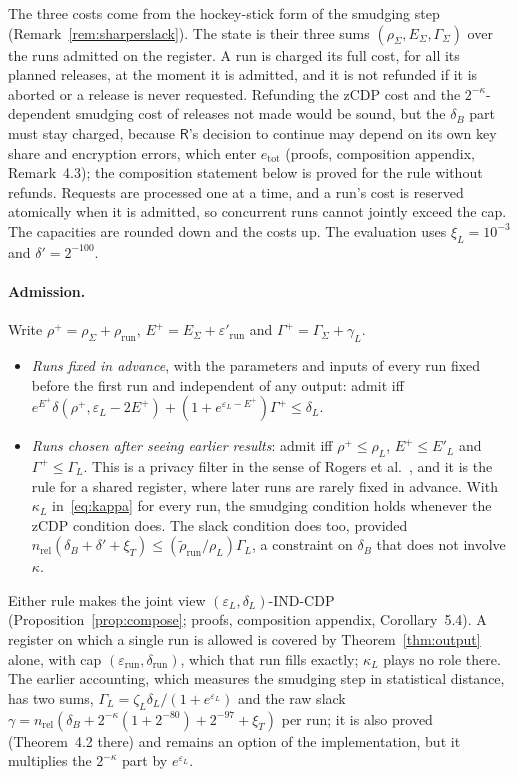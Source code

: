 \documentclass[11pt]{article}
\theoremstyle{definition}
\theoremstyle{plain}
\newcommand{\Party}[1]{\textsf{#1}}
\newcommand{\Rp}{\Party{R}}
\begin{document}
The three costs come from the hockey-stick form of the smudging step (Remark~\ref{rem:sharperslack}). The state is their three sums $(\rho_\Sigma, E_\Sigma, \Gamma_\Sigma)$ over the runs admitted on the register. A run is charged its full cost, for all its planned releases, at the moment it is admitted, and it is not refunded if it is aborted or a release is never requested. Refunding the zCDP cost and the $2^{-\kappa}$-dependent smudging cost of releases not made would be sound, but the $\delta_B$ part must stay charged, because $\Rp$'s decision to continue may depend on its own key share and encryption errors, which enter $e_{\mathrm{tot}}$ (proofs, composition appendix, Remark~4.3); the composition statement below is proved for the rule without refunds. Requests are processed one at a time, and a run's cost is reserved atomically when it is admitted, so concurrent runs cannot jointly exceed the cap. The capacities are rounded down and the costs up. The evaluation uses $\xi_L = 10^{-3}$ and $\delta' = 2^{-100}$.

\paragraph{Admission.} Write $\rho^+ = \rho_\Sigma + \rho_{\mathrm{run}}$, $E^+ = E_\Sigma + \varepsilon'_{\mathrm{run}}$ and $\Gamma^+ = \Gamma_\Sigma + \gamma_L$.
\begin{itemize}[noitemsep]
  \item \emph{Runs fixed in advance}, with the parameters and inputs of every run fixed before the first run and independent of any output: admit iff $e^{E^+}\delta(\rho^+, \varepsilon_L - 2E^+) + (1 + e^{\varepsilon_L - E^+})\Gamma^+ \le \delta_L$.
  \item \emph{Runs chosen after seeing earlier results}: admit iff $\rho^+ \le \rho_L$, $E^+ \le E'_L$ and $\Gamma^+ \le \Gamma_L$. This is a privacy filter in the sense of Rogers et al.~\cite{rogers2016odometers}, and it is the rule for a shared register, where later runs are rarely fixed in advance. With $\kappa_L$ in~\eqref{eq:kappa} for every run, the smudging condition holds whenever the zCDP condition does. The slack condition does too, provided $n_{\mathrm{rel}}(\delta_B + \delta' + \xi_T) \le (\tilde\rho_{\mathrm{run}}/\rho_L)\Gamma_L$, a constraint on $\delta_B$ that does not involve $\kappa$.
\end{itemize}
Either rule makes the joint view $(\varepsilon_L, \delta_L)$-IND-CDP (Proposition~\ref{prop:compose}; proofs, composition appendix, Corollary~5.4). A register on which a single run is allowed is covered by Theorem~\ref{thm:output} alone, with cap $(\varepsilon_{\mathrm{run}}, \delta_{\mathrm{run}})$, which that run fills exactly; $\kappa_L$ plays no role there. The earlier accounting, which measures the smudging step in statistical distance, has two sums, $\Gamma_L = \zeta_L\delta_L/(1 + e^{\varepsilon_L})$ and the raw slack $\gamma = n_{\mathrm{rel}}(\delta_B + 2^{-\kappa}(1 + 2^{-80}) + 2^{-97} + \xi_T)$ per run; it is also proved (Theorem~4.2 there) and remains an option of the implementation, but it multiplies the $2^{-\kappa}$ part by $e^{\varepsilon_L}$.
\end{document}
